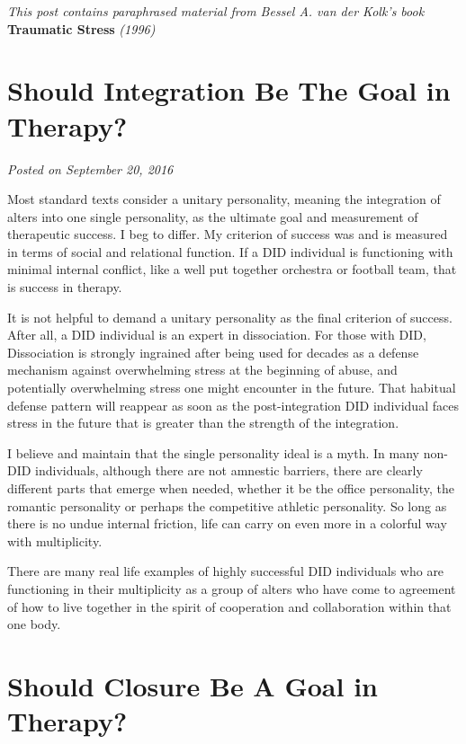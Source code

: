 \documentclass[]{book}
\begin{document}
\emph{This post contains paraphrased material from Bessel A. van der Kolk's book} \textbf{Traumatic Stress} \emph{(1996)}

\hypertarget{should-integration-be-the-goal-in-therapy}{%
\section{Should Integration Be The Goal in Therapy?}\label{should-integration-be-the-goal-in-therapy}}

\emph{Posted on September 20, 2016}

Most standard texts consider a unitary personality, meaning the integration of alters into one single personality, as the ultimate goal and measurement of therapeutic success. I beg to differ. My criterion of success was and is measured in terms of social and relational function. If a DID individual is functioning with minimal internal conflict, like a well put together orchestra or football team, that is success in therapy.

It is not helpful to demand a unitary personality as the final criterion of success. After all, a DID individual is an expert in dissociation. For those with DID, Dissociation is strongly ingrained after being used for decades as a defense mechanism against overwhelming stress at the beginning of abuse, and potentially overwhelming stress one might encounter in the future. That habitual defense pattern will reappear as soon as the post-integration DID individual faces stress in the future that is greater than the strength of the integration.

I believe and maintain that the single personality ideal is a myth. In many non-DID individuals, although there are not amnestic barriers, there are clearly different parts that emerge when needed, whether it be the office personality, the romantic personality or perhaps the competitive athletic personality. So long as there is no undue internal friction, life can carry on even more in a colorful way with multiplicity.

There are many real life examples of highly successful DID individuals who are functioning in their multiplicity as a group of alters who have come to agreement of how to live together in the spirit of cooperation and collaboration within that one body.

\hypertarget{should-closure-be-a-goal-in-therapy}{%
\section{Should Closure Be A Goal in Therapy?}\label{should-closure-be-a-goal-in-therapy}}
\end{document}
